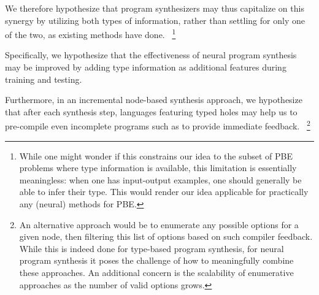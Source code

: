 \documentclass{article}
\begin{document}
We therefore hypothesize that program synthesizers may thus capitalize on this synergy by utilizing both types of information,
rather than settling for only one of the two, as existing methods have done.%
~\footnote{While one might wonder if this constrains our idea to the subset of PBE problems where type information is available,
this limitation is essentially meaningless: when one has input-output examples, one should generally be able to infer their type.
This would render our idea applicable for practically any (neural) methods for PBE.}

Specifically, we hypothesize that the effectiveness of neural program synthesis may be improved by
adding type information as additional features during training and testing.

Furthermore, in an incremental node-based synthesis approach, we hypothesize that after each synthesis step,
languages featuring typed holes may help us to pre-compile even incomplete programs such as to provide immediate feedback.%
~\footnote{
    An alternative approach would be to enumerate any possible options for a given node,
    then filtering this list of options based on such compiler feedback.
    While this is indeed done for type-based program synthesis,
    for neural program synthesis it poses the challenge of how to meaningfully combine these approaches.
    An additional concern is the scalability of enumerative approaches as the number of valid options grows.
}


\end{document}
